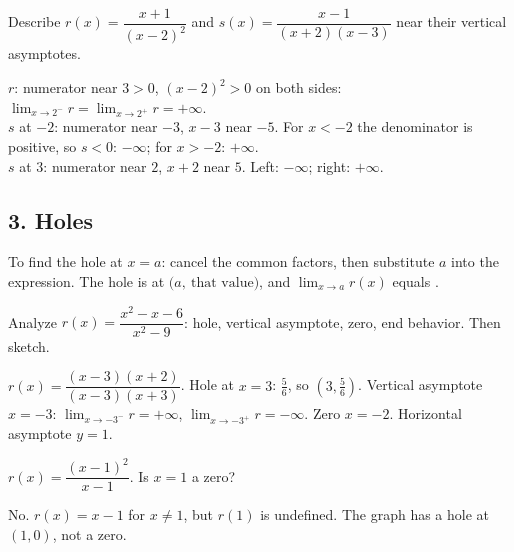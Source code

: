 Describe $r(x)=\dfrac{x+1}{(x-2)^2}$ and $s(x)=\dfrac{x-1}{(x+2)(x-3)}$ near their vertical asymptotes.
\begin{workspace}[4cm]
$r$: numerator near $3>0$, $(x-2)^2>0$ on both sides: $\lim_{x\to2^-}r=\lim_{x\to2^+}r=+\infty$.\\
$s$ at $-2$: numerator near $-3$, $x-3$ near $-5$. For $x<-2$ the denominator is positive, so $s<0$: $-\infty$; for $x>-2$: $+\infty$.\\
$s$ at $3$: numerator near $2$, $x+2$ near $5$. Left: $-\infty$; right: $+\infty$.
\end{workspace}

\subsection*{3. Holes}
\begin{keyidea}
To find the hole at $x=a$: cancel the common factors, then substitute $a$ into the  expression. The hole is at $\big(a,\ \text{that value}\big)$, and $\lim_{x\to a}r(x)$ equals .
\end{keyidea}

Analyze $r(x)=\dfrac{x^2-x-6}{x^2-9}$: hole, vertical asymptote, zero, end behavior. Then sketch.
\begin{workspace}[6cm]
$r(x)=\dfrac{(x-3)(x+2)}{(x-3)(x+3)}$. Hole at $x=3$: $\frac{5}{6}$, so $\left(3,\frac56\right)$. Vertical asymptote $x=-3$: $\lim_{x\to-3^-}r=+\infty$, $\lim_{x\to-3^+}r=-\infty$. Zero $x=-2$. Horizontal asymptote $y=1$.
\begin{center}
\end{center}
\end{workspace}

$r(x)=\dfrac{(x-1)^2}{x-1}$. Is $x=1$ a zero?
\begin{workspace}[2cm]
No. $r(x)=x-1$ for $x\neq1$, but $r(1)$ is undefined. The graph has a hole at $(1,0)$, not a zero.
\end{workspace}

